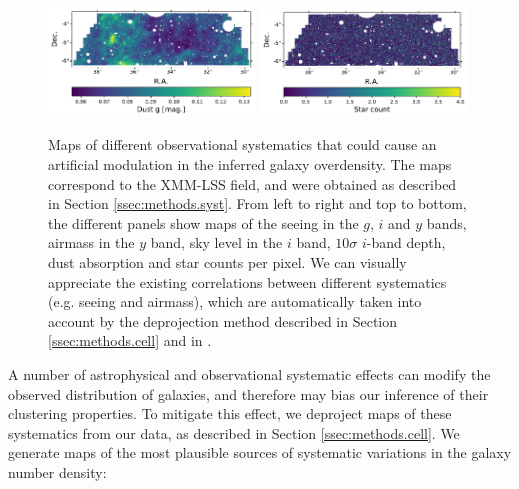 \documentclass[a4paper,11pt]{article}
\begin{document}
\begin{figure}
      \includegraphics[width=0.49\textwidth]{figures/syst_dust.pdf}
      \includegraphics[width=0.49\textwidth]{figures/syst_star.pdf}
      \caption{Maps of different observational systematics that could cause an artificial modulation in the inferred galaxy overdensity. The maps correspond to the XMM-LSS field, and were obtained as described in Section \ref{ssec:methods.syst}. From left to right and top to bottom, the different panels show maps of the seeing in the $g$, $i$ and $y$ bands, airmass in the $y$ band, sky level in the $i$ band, $10\sigma$ $i$-band depth, dust absorption and star counts per pixel. We can visually appreciate the existing correlations between different systematics (e.g. seeing and airmass), which are automatically taken into account by the deprojection method described in Section \ref{ssec:methods.cell} and in \cite{2019MNRAS.484.4127A}.}
      \label{fig:sysmap}
    \end{figure}
    A number of astrophysical and observational systematic effects can modify the observed distribution of galaxies, and therefore may bias our inference of their clustering properties. To mitigate this effect, we deproject maps of these systematics from our data, as described in Section \ref{ssec:methods.cell}. We generate maps of the most plausible sources of systematic variations in the galaxy number density:
\end{document}

